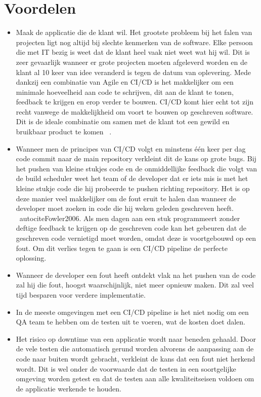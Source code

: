 \section{Voordelen}
\begin{itemize}
    \item Maak de applicatie die de klant wil. Het grootste probleem bij het falen van projecten ligt nog altijd bij slechte kenmerken van de software. Elke persoon die met IT bezig is weet dat de klant heel vaak niet weet wat hij wil. Dit is zeer gevaarlijk wanneer er grote projecten moeten afgeleverd worden en de klant al 10 keer van idee veranderd is tegen de datum van oplevering. Mede dankzij een combinatie van Agile en CI/CD is het makkelijker om een minimale hoeveelheid aan code te schrijven, dit aan de klant te tonen, feedback te krijgen en erop verder te bouwen. CI/CD komt hier echt tot zijn recht vanwege de makkelijkheid om voort te bouwen op geschreven software. Dit is de ideale combinatie om samen met de klant tot een gewild en bruikbaar product te komen ~\autocite{Humble2012}.
    \item Wanneer men de principes van CI/CD volgt en minstens één keer per dag code commit naar de main repository verkleint dit de kans op grote bugs. Bij het pushen van kleine stukjes code en de onmiddellijke feedback die volgt van de build scheduler weet het team of de developer dat er iets mis is met het kleine stukje code die hij probeerde te pushen richting repository. Het is op deze manier veel makkelijker om de fout eruit te halen dan wanneer de developer moet zoeken in code die hij weken geleden geschreven heeft. ~autocite{Fowler2006}.
    Als men dagen aan een stuk programmeert zonder deftige feedback te krijgen op de geschreven code kan het gebeuren dat de geschreven code vernietigd moet worden, omdat deze is voortgebouwd op een fout. Om dit verlies tegen te gaan is een CI/CD pipeline de perfecte oplossing.
    \item Wanneer de developer een fout heeft ontdekt vlak na het pushen van de code zal hij die fout, hoogst waarschijnlijk, niet meer opnieuw maken. Dit zal veel tijd besparen voor verdere implementatie.
    \item In de meeste omgevingen met een CI/CD pipeline is het niet nodig om een QA team te hebben om de testen uit te voeren, wat de kosten doet dalen.
    \item Het risico op downtime van een applicatie wordt naar beneden gehaald. Door de vele testen die automatisch gerund worden alvorens de aanpassing aan de code naar buiten wordt gebracht, verkleint de kans dat een fout niet herkend wordt. Dit is wel onder de voorwaarde dat de testen in een soortgelijke omgeving worden getest en dat de testen aan alle kwaliteitseisen voldoen om de applicatie werkende te houden.

\end{itemize}
